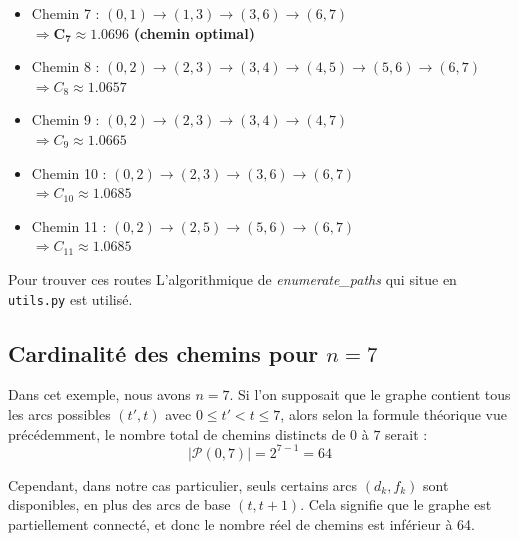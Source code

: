 \documentclass[a4paper,11pt]{article}
\begin{document}
\begin{itemize}
	\item Chemin 7 : $(0,1) \to (1,3) \to (3,6) \to (6,7)$ \\
	      \hspace{0.5cm} $\Rightarrow \mathbf{C_7 \approx 1.0696}$ \textbf{(chemin optimal)}
	      \vspace{0.3cm}
	      
	\item Chemin 8 : $(0,2) \to (2,3) \to (3,4) \to (4,5) \to (5,6) \to (6,7)$ \\
	      \hspace{0.5cm} $\Rightarrow C_8 \approx 1.0657$
	      \vspace{0.3cm}
	      
	\item Chemin 9 : $(0,2) \to (2,3) \to (3,4) \to (4,7)$ \\
	      \hspace{0.5cm} $\Rightarrow C_9 \approx 1.0665$
	      \vspace{0.3cm}
	      
	\item Chemin 10 : $(0,2) \to (2,3) \to (3,6) \to (6,7)$ \\
	      \hspace{0.5cm} $\Rightarrow C_{10} \approx 1.0685$
	      \vspace{0.3cm}
	      
	\item Chemin 11 : $(0,2) \to (2,5) \to (5,6) \to (6,7)$ \\
	      \hspace{0.5cm} $\Rightarrow C_{11} \approx 1.0685$
	      \vspace{0.3cm}
\end{itemize}

Pour trouver ces routes L'algorithmique de \textit{enumerate\_paths} qui situe en \texttt{utils.py} est utilisé.


\subsection{Cardinalité des chemins pour $n = 7$}
Dans cet exemple, nous avons $n = 7$. Si l'on supposait que le graphe contient tous les arcs possibles $(t', t)$ avec $0 \leq t' < t \leq 7$, alors selon la formule théorique vue précédemment, le nombre total de chemins distincts de $0$ à $7$ serait :
\[
	|\mathcal{P}(0, 7)| = 2^{7 - 1} = 64
\]

Cependant, dans notre cas particulier, seuls certains arcs $(d_k, f_k)$ sont disponibles, en plus des arcs de base $(t, t+1)$. Cela signifie que le graphe est partiellement connecté, et donc le nombre réel de chemins est inférieur à 64.
\end{document}
